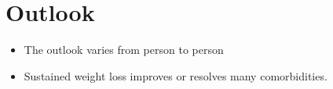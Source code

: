 \section{Outlook}
\begin{itemize}[noitemsep]
  \item The outlook varies from person to person
  \item Sustained weight loss improves or resolves many comorbidities.
\end{itemize}
